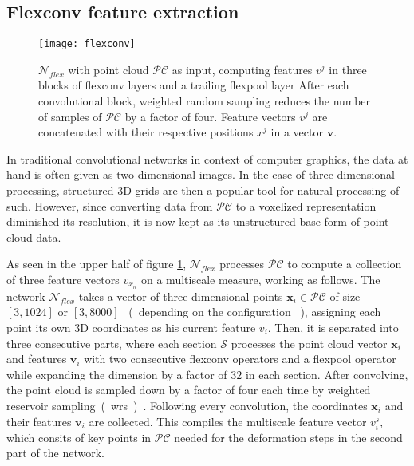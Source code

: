 \subsection{Flexconv feature extraction}
\label{fconv}

\begin{figure}
   \begin{center}
   \texttt{[image: flexconv]}
   \caption{$\mathcal{N}_{flex}$ with point cloud $\mathcal{PC}$ as input, computing features $v^j$ in three blocks of flexconv layers and a trailing flexpool layer  After each convolutional block, weighted random sampling reduces the number of samples of $\mathcal{PC}$ by a factor of four. Feature vectors $v^j$ are concatenated with their respective positions $x^j$ in a vector $\textbf{v}$.}
   \label{fig:flexconv}
   \end{center}
 \end{figure}

In traditional convolutional networks in context of computer graphics, the data at hand is often given as two dimensional images.
 In the case of three-dimensional processing, structured 3D grids are then a popular tool for natural processing 
 of such. However, since converting data from $\mathcal{PC}$ to a voxelized representation diminished its resolution, 
 it is now kept as its unstructured base form of point cloud data. 

As seen in the upper half of figure \ref{fig:flexconv}, $\mathcal{N}_{flex}$ processes $\mathcal{PC}$ to compute
 a collection of three feature vectors $v_{x_n}$ on a multiscale measure, working as follows.
 The network $\mathcal{N}_{flex}$ takes a vector of three-dimensional points $\textbf{x}_i \in \mathcal{PC}$ 
 of size $[3,1024]$ or $[3,8000]$ ~(~depending on the configuration ~), assigning each point its own 3D coordinates
  as his current feature $v_i$.
Then, it is separated into three consecutive parts, where each section $\mathcal{S}$ processes the point cloud vector $\textbf{x}_i$ and features $\textbf{v}_i$
 with two consecutive flexconv operators and a flexpool operator while expanding the dimension by a factor of $32$ in each section.
After convolving, the point cloud is sampled down by a factor of four each time by weighted reservoir sampling~(~wrs~)~. 
Following every convolution, the coordinates $\textbf{x}_i$ and their features $\textbf{v}_i$ are collected. 
This compiles the multiscale feature vector $v_i^s$, which consits of key points in $\mathcal{PC}$ needed for the deformation steps in the second part of the network.



